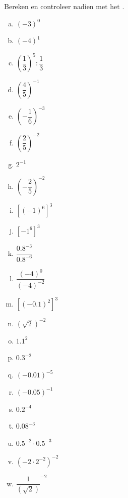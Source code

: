\documentclass[12pt,twoside]{article}
\begin{document}
\begin{oefening}
Bereken en controleer nadien met het .
\begin{multicols}{4}
\begin{enumerate}[(a)]
  \itemsep1em
  \item $\left(-3\right)^0$
  \item $\left(-4\right)^1$
  \item $\left(\dfrac{1}{3}\right)^5:\dfrac{1}{3}$
  \item $\left(\dfrac{4}{5}\right)^{-1}$
  \item $\left(-\dfrac{1}{6}\right)^{-3}$
  \item $\left(\dfrac{2}{5}\right)^{-2}$
  \item $2^{-1}$
  \item $\left(-\dfrac{2}{5}\right)^{-2}$
  \item $\left[\left(-1\right)^6\right]^3$
  \item $[-1^6]^3$
  \item $\dfrac{0.8^{-3}}{0.8^{-6}}$
  \item $\dfrac{\left(-4\right)^{0}}{\left(-4\right)^{-2}}$
  \item $[\left(-0.1\right)^2]^3$
  \item $\left(\sqrt{2}\right)^{-2}$
  \item $1.1^2$
  \item $0.3^{-2}$
  \item $\left(-0.01\right)^{-5}$
  \item $\left(-0.05\right)^{-1}$
  \item $0.2^{-4}$
  \item $0.08^{-3}$
  \item $0.5^{-2}\cdot0.5^{-3}$
  \item $\left(-2\cdot2^{-2}\right)^{-2}$
  \item $\dfrac{1}{\left(\sqrt{2}\right)}^{-2}$
\end{enumerate}
\end{multicols}
\end{oefening}
\end{document}
